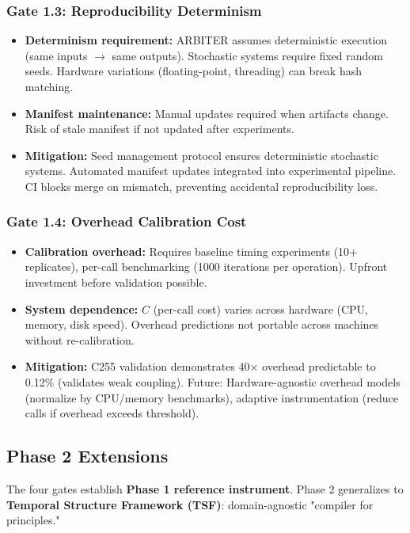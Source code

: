 \documentclass[11pt]{article}
\begin{document}
\subsubsection{Gate 1.3: Reproducibility Determinism}

\begin{itemize}
\item \textbf{Determinism requirement:} ARBITER assumes deterministic execution (same inputs $\rightarrow$ same outputs). Stochastic systems require fixed random seeds. Hardware variations (floating-point, threading) can break hash matching.
\item \textbf{Manifest maintenance:} Manual updates required when artifacts change. Risk of stale manifest if not updated after experiments.
\item \textbf{Mitigation:} Seed management protocol ensures deterministic stochastic systems. Automated manifest updates integrated into experimental pipeline. CI blocks merge on mismatch, preventing accidental reproducibility loss.
\end{itemize}

\subsubsection{Gate 1.4: Overhead Calibration Cost}

\begin{itemize}
\item \textbf{Calibration overhead:} Requires baseline timing experiments (10+ replicates), per-call benchmarking (1000 iterations per operation). Upfront investment before validation possible.
\item \textbf{System dependence:} $C$ (per-call cost) varies across hardware (CPU, memory, disk speed). Overhead predictions not portable across machines without re-calibration.
\item \textbf{Mitigation:} C255 validation demonstrates 40$\times$ overhead predictable to 0.12\% (validates weak coupling). Future: Hardware-agnostic overhead models (normalize by CPU/memory benchmarks), adaptive instrumentation (reduce calls if overhead exceeds threshold).
\end{itemize}

\subsection{Phase 2 Extensions}

The four gates establish \textbf{Phase 1 reference instrument}. Phase 2 generalizes to \textbf{Temporal Structure Framework (TSF)}: domain-agnostic "compiler for principles."
\end{document}
